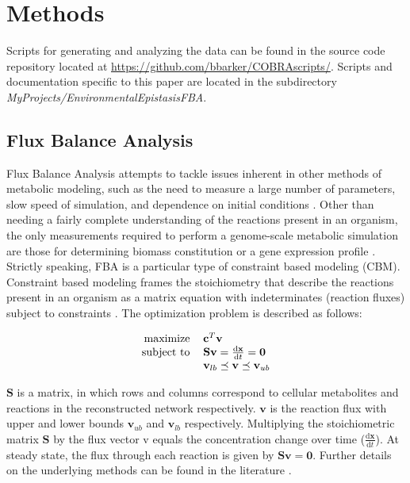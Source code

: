 \documentclass[10pt]{article}
\def\D{\mathrm{d}}
\newcommand{\citep}{\cite}
\begin{document}
\section*{Methods}

Scripts for generating and analyzing the data can be found in the
source code repository located at
\url{https://github.com/bbarker/COBRAscripts/}. Scripts and
documentation specific to this paper are located in the subdirectory
\emph{MyProjects/EnvironmentalEpistasisFBA}.

\subsection*{Flux Balance Analysis}

Flux Balance Analysis attempts to tackle issues inherent in other
methods of metabolic modeling, such as the need to measure a large
number of parameters, slow speed of simulation, and dependence on
initial conditions \citep{Orth2010, Schellenberger2011a}. 
Other than needing a fairly complete
understanding of the reactions present in an organism, the only
measurements required to perform a genome-scale metabolic simulation
are those for determining biomass constitution or a gene expression
profile \citep{Shlomi2005, Mo2009}. Strictly speaking, FBA is a particular type of
constraint based modeling (CBM). Constraint based modeling frames the
stoichiometry that describe the reactions present in an organism as a
matrix equation with indeterminates (reaction fluxes) subject to
constraints \citep{Smallbone2009a, Mo2009}. The optimization problem
is described as follows:


\begin{equation}
\centering
\begin{tabular}{rl}
maximize   & $\mathbf{c}^T\mathbf{v}$                                     \\
subject to & $\mathbf{S v} = \frac{\D{\mathbf{x}}}{\D{t}} = \mathbf{0}$   \\
           & $\mathbf{v}_{lb} \preceq \mathbf{v} \preceq \mathbf{v}_{ub}$ \\
\end{tabular}
\end{equation}

$\mathbf{S}$ is a matrix, in which rows and columns correspond to
cellular metabolites and reactions in the reconstructed network
respectively. $\mathbf{v}$ is the reaction flux with upper and lower
bounds $\mathbf{v}_{ub}$ and $\mathbf{v}_{lb}$
respectively. Multiplying the stoichiometric matrix $\mathbf{S}$ by
the flux vector v equals the concentration change over time
($\frac{\D{\mathbf{x}}}{\D{t}}$). At steady state, the flux through
each reaction is given by $\mathbf{Sv} = \mathbf{0}$. Further details
on the underlying methods can be found in the literature 
\citep{Xu2012, Smallbone2009a, He2010}.
\end{document}

